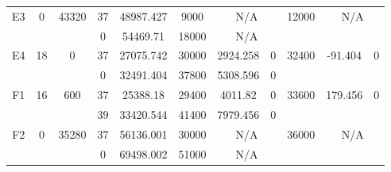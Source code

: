 \begin{sidewaystable}
\begin{tabular}{c||c|c||c|c|c|c|c||c|c|c}
         &
        
      \\
      \hline
      \multirow{2}{*}{E3} &
      \multirow{2}{*}{0} &
      \multirow{2}{*}{43320} &
      37 &
      48987.427 &
      9000 &
        \multicolumn{2}{|c||}{N/A} &
      \multirow{2}{*}{12000} &
        \multicolumn{2}{c}{\multirow{2}{*}{N/A}}
      \\
      \cline{4-8}
       &
       &
       &
      0 &
      54469.71 &
      18000 &
        \multicolumn{2}{|c||}{N/A} &
      
        
      \\
      \hline
      \multirow{2}{*}{E4} &
      \multirow{2}{*}{18} &
      \multirow{2}{*}{0} &
      37 &
      27075.742 &
      30000 &
        2924.258 &
        0 &
      \multirow{2}{*}{32400} &
        \multirow{2}{*}{-91.404} &
        \multirow{2}{*}{0}
      \\
      \cline{4-8}
       &
       &
       &
      0 &
      32491.404 &
      37800 &
        5308.596 &
        0 &
      
         &
        
      \\
      \hline
      \multirow{2}{*}{F1} &
      \multirow{2}{*}{16} &
      \multirow{2}{*}{600} &
      37 &
      25388.18 &
      29400 &
        4011.82 &
        0 &
      \multirow{2}{*}{33600} &
        \multirow{2}{*}{179.456} &
        \multirow{2}{*}{0}
      \\
      \cline{4-8}
       &
       &
       &
      39 &
      33420.544 &
      41400 &
        7979.456 &
        0 &
      
         &
        
      \\
      \hline
      \multirow{2}{*}{F2} &
      \multirow{2}{*}{0} &
      \multirow{2}{*}{35280} &
      37 &
      56136.001 &
      30000 &
        \multicolumn{2}{|c||}{N/A} &
      \multirow{2}{*}{36000} &
        \multicolumn{2}{c}{\multirow{2}{*}{N/A}}
      \\
      \cline{4-8}
       &
       &
       &
      0 &
      69498.002 &
      51000 &
        \multicolumn{2}{|c||}{N/A} &
      
        
      \\
\end{tabular}
\label{table:RDS2.txt-7867.tex} 
\end{sidewaystable}